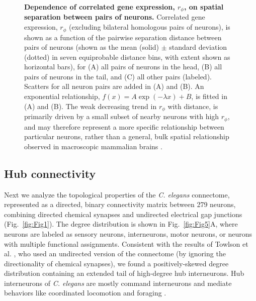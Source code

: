 \documentclass[10pt,letterpaper]{article}
\begin{document}
\begin{figure}[h]
  \centering
  \caption{
  \textbf{Dependence of correlated gene expression, $r_\phi$, on spatial separation between pairs of neurons.}
  Correlated gene expression, $r_\phi$ (excluding bilateral homologous pairs of neurons), is shown as a function of the pairwise separation distance between pairs of neurons (shown as the mean (solid) $\pm$ standard deviation (dotted) in seven equiprobable distance bins, with extent shown as horizontal bars), for (A) all pairs of neurons in the head, (B) all pairs of neurons in the tail, and (C) all other pairs (labeled).
  Scatters for all neuron pairs are added in (A) and (B).
  An exponential relationship, $f(x) = A\exp(-\lambda x) + B$, is fitted in (A) and (B).
  The weak decreasing trend in $r_\phi$ with distance, is primarily driven by a small subset of nearby neurons with high $r_\phi$, and may therefore represent a more specific relationship between particular neurons, rather than a general, bulk spatial relationship observed in macroscopic mammalian brains \cite{Fulcher:2016ck, Krienen:2016eq}.
\label{fig:Fig4}
  }
\end{figure}

\subsection*{Hub connectivity}

Next we analyze the topological properties of the \emph{C. elegans} connectome, represented as a directed, binary connectivity matrix between 279 neurons, combining directed chemical synapses and undirected electrical gap junctions (Fig.~\ref{fig:Fig1}).
The degree distribution is shown in Fig.~\ref{fig:Fig5}A, where neurons are labeled as sensory neurons, interneurons, motor neurons, or neurons with multiple functional assignments.
Consistent with the results of Towlson et al. \cite{Towlson2013},  who used an undirected version of the connectome (by ignoring the directionality of chemical synapses), we found a positively-skewed degree distribution containing an extended tail of high-degree hub interneurons.
Hub interneurons of \emph{C. elegans} are mostly command interneurons and mediate behaviors like coordinated locomotion and foraging \cite{tsalik2003}.
\end{document}
